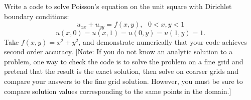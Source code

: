 \documentclass[10pt]{article}
\begin{document}
\maketitle



\begin{problem}[Problem 1]
Write a code to solve Poisson's equation on the unit square with Dirichlet
boundary conditions:
\[
u_{xx} + u_{yy} = f(x,y) ,~~~0 < x,y < 1 
\]
\[
u(x,0) = u(x,1) = u(0,y) = u(1,y) = 1.
\]
Take \( f(x,y) = x^2 + y^2 \), and demonstrate numerically that your code 
achieves second order accuracy.  [Note:  If you do not know an analytic
solution to a problem, one way to check the code is to solve the problem
on a fine grid and pretend that the result is the exact solution, then
solve on coarser grids and compare your answers to the fine grid solution.
However, you must be sure to compare solution values corresponding to
the same points in the domain.]
\end{problem}
\end{document}
